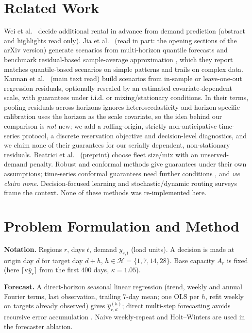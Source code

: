 \documentclass[conference]{IEEEtran}
\begin{document}
\section{Related Work}
Wei et al.\ \cite{wei2024} decide additional rental in advance from demand prediction (abstract and highlights read only). Jia et al.\ \cite{jia2025} (read in part: the opening sections of the arXiv version) generate scenarios from multi-horizon quantile forecasts \cite{wen2017} and benchmark residual-based sample-average approximation \cite{kannan2022}, which they report matches quantile-based scenarios on simple patterns and trails on complex data. Kannan et al.\ \cite{kannan2022} (main text read) build scenarios from in-sample or leave-one-out regression residuals, optionally rescaled by an estimated covariate-dependent scale, with guarantees under i.i.d. or mixing/stationary conditions. In their terms, pooling residuals across horizons ignores heteroscedasticity and horizon-specific calibration uses the horizon as the scale covariate, so the idea behind our comparison is \emph{not} new; we add a rolling-origin, strictly non-anticipative time-series protocol, a discrete reservation objective and decision-level diagnostics, and we claim none of their guarantees for our serially dependent, non-stationary residuals. Beatrici et al.\ \cite{beatrici2025} (preprint) choose fleet size/mix with an unserved-demand penalty. Robust and conformal methods \cite{ghosal2024,patel2024} give guarantees under their own assumptions; time-series conformal guarantees need further conditions \cite{gibbs2021,barber2023}, and \emph{we claim none}. Decision-focused learning \cite{elmachtoub2022} and stochastic/dynamic routing surveys \cite{gendreau2016,psaraftis2016} frame the context. None of these methods was re-implemented here.



\section{Problem Formulation and Method}
\textbf{Notation.} Regions $r$, days $t$, demand $y_{r,t}$ (load units). A decision is made at origin day $d$ for target day $d{+}h$, $h\in\mathcal H=\{1,7,14,28\}$. Base capacity $A_r$ is fixed (here $\lceil\kappa\bar y_r\rceil$ from the first 400 days, $\kappa{=}1.05$).

\textbf{Forecast.} A direct-horizon seasonal linear regression (trend, weekly and annual Fourier terms, last observation, trailing 7-day mean; one OLS per $h$, refit weekly on targets already observed) gives $\hat y^{(h)}_{r,d}$; direct multi-step forecasting avoids recursive error accumulation \cite{chevillon2007}. Naive weekly-repeat and Holt--Winters are used in the forecaster ablation.
\end{document}
